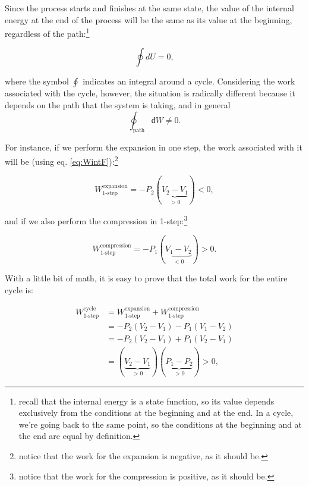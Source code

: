 \documentclass[
  9pt,
]{extbook}
\theoremstyle{definition}
\theoremstyle{definition}
\theoremstyle{definition}
\theoremstyle{remark}
\begin{document}
Since the process starts and finishes at the same state, the value of the internal energy at the end of the process will be the same as its value at the beginning, regardless of the path:\footnote{recall that the internal energy is a state function, so its value depends exclusively from the conditions at the beginning and at the end. In a cycle, we're going back to the same point, so the conditions at the beginning and at the end are equal by definition.}

\begin{equation}
  \oint dU=0,
  \label{eq:de0}
\end{equation}

where the symbol \(\oint\) indicates an integral around a cycle. Considering the work associated with the cycle, however, the situation is radically different because it depends on the path that the system is taking, and in general
\begin{equation}
\oint_{\text{path}} đW \neq 0.
  \label{eq:dw0}
\end{equation}

For instance, if we perform the expansion in one step, the work associated with it will be (using eq. \eqref{eq:WintF}):\footnote{notice that the work for the expansion is negative, as it should be.}

\begin{equation}
  W^{\text{expansion}}_{\text{1-step}}=-P_2(\underbrace{V_2-V_1}_{>0})<0,
  \label{eq:Wexp1}
\end{equation}

and if we also perform the compression in 1-step:\footnote{notice that the work for the compression is positive, as it should be.}

\begin{equation}
  W^{\text{compression}}_{\text{1-step}}=-P_1(\underbrace{V_1-V_2}_{<0})>0.
  \label{eq:Wcomp1}
\end{equation}

With a little bit of math, it is easy to prove that the total work for the entire cycle is:

\begin{equation}
\begin{aligned}
W^{\text{cycle}}_{\text{1-step}} {} & =  W^{\text{expansion}}_{\text{1-step}}+W^{\text{compression}}_{\text{1-step}} \\
 & = -P_2(V_2-V_1)-P_1(V_1-V_2) \\
 & = -P_2(V_2-V_1)+P_1(V_2-V_1) \\
 & = (\underbrace{V_2-V_1}_{>0})(\underbrace{P_1-P_2}_{>0}) > 0,
\end{aligned}
  \label{eq:Wtot1}
\end{equation}
\end{document}
